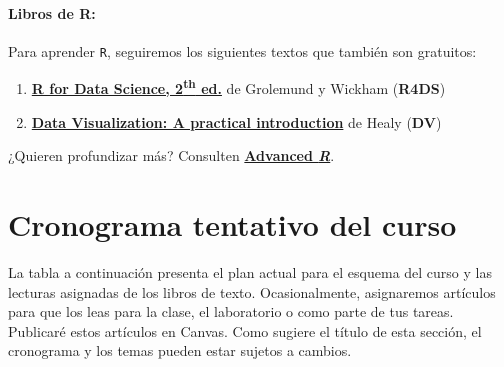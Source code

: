 \documentclass[10pt]{article}
\begin{document}
\paragraph{Libros de R:} Para aprender \texttt{R}, seguiremos los siguientes textos que también son gratuitos:

\begin{enumerate}
\item \href{https://r4ds.hadley.nz/}{\textbf{R for Data Science, 2\textsuperscript{th} ed.}} de Grolemund y Wickham (\textbf{R4DS})
\item \href{http://socviz.co/}{\textbf{Data Visualization: A practical introduction}} de Healy (\textbf{DV})
\end{enumerate}

¿Quieren profundizar más? Consulten \href{http://adv-r.had.co.nz/}{\textbf{Advanced \textit{R}}}.



\section*{Cronograma tentativo del curso}

La tabla a continuación presenta el plan actual para el esquema del curso y las lecturas asignadas de los libros de texto. Ocasionalmente, asignaremos artículos para que los leas para la clase, el laboratorio o como parte de tus tareas. Publicaré estos artículos en Canvas. Como sugiere el título de esta sección, el cronograma y los temas pueden estar sujetos a cambios.
\end{document}
